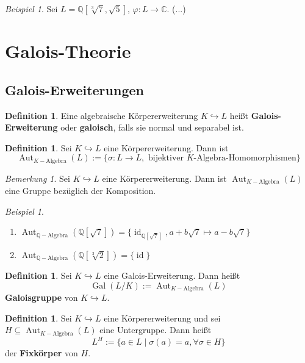 \documentclass[10pt,a4paper]{article}
\newcommand{\Q}{\ensuremath{\mathbb{Q}}}
\newcommand{\C}{\ensuremath{\mathbb{C}}}
\newcommand{\Aut}{\operatorname{Aut}}
\newcommand{\id}{\operatorname{id}}
\newcommand{\Gal}{\ensuremath{\operatorname{Gal}}}
\newcounter{thm}[section]
\theoremstyle{definition}
\newtheorem{definition}[thm]{Definition}
\theoremstyle{plain}
\theoremstyle{remark}
\newtheorem*{bem*}{Bemerkung}
\newtheorem{exm}[thm]{Beispiel}
\newtheorem*{exm*}{Beispiel}
\begin{document}
\addtocounter{thm}{-1}
\begin{exm}
	Sei $L=\Q[\sqrt[3]{7},\sqrt{5}]$, $\varphi:L\rightarrow \C$.
	(...) %
\end{exm}






\section{Galois-Theorie}
\subsection{Galois-Erweiterungen}


\begin{definition}
	Eine algebraische Körpererweiterung $K\hookrightarrow L$ heißt \textbf{Galois-Erweiterung} oder \textbf{galoisch}, falls sie normal und separabel ist.
\end{definition}

\begin{definition}
	Sei $K\hookrightarrow L$ eine Körpererweiterung. Dann ist
	\[\Aut_{K-\text{Algebra}}(L):=\{\sigma:L\rightarrow L,\text{ bijektiver $K$-Algebra-Homomorphismen}\}\]
\end{definition}
\begin{bem*}
	Sei $K\hookrightarrow L$ eine Körpererweiterung. Dann ist $\Aut_{K-\text{Algebra}}(L)$ eine Gruppe bezüglich der Komposition.
\end{bem*}


\begin{exm*}
	\begin{enumerate}
		\item $\Aut_{\Q-\text{Algebra}}(\Q[\sqrt{7}])=\{\id_{\Q[\sqrt{7}]},a+b\sqrt{7}\mapsto a-b\sqrt{7}\}$
		\item $\Aut_{\Q-\text{Algebra}}(\Q[\sqrt[3]{2}])=\{\id\}$
	\end{enumerate}
\end{exm*}

\addtocounter{thm}{-1}
\begin{definition}
	Sei $K\hookrightarrow L$ eine Galois-Erweiterung. Dann heißt
	\[\Gal(L/K):=\Aut_{K-\text{Algebra}}(L)\]
	\textbf{Galoisgruppe} von $K\hookrightarrow L$.
\end{definition}
\begin{definition}
	Sei $K\hookrightarrow L$ eine Körpererweiterung und sei $H\subseteq \Aut_{K-\text{Algebra}}(L)$ eine Untergruppe. Dann heißt\[L^H:=\{a\in L\mid\sigma(a)=a,\forall\sigma\in H\}\]
	 der \textbf{Fixkörper} von $H$.
\end{definition}
\end{document}
